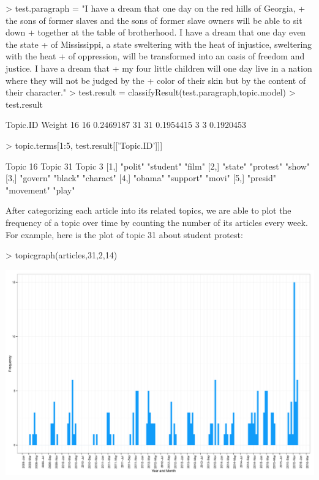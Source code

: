 \documentclass[a4paper]{article}
\begin{document}
\begin{Schunk}
\begin{Sinput}
> test.paragraph = "I have a dream that one day on the red hills of Georgia, 
+ the sons of former slaves and the sons of former slave owners will be able to sit down 
+ together at the table of brotherhood. I have a dream that one day even the state 
+ of Mississippi, a state sweltering with the heat of injustice, sweltering with the heat 
+ of oppression, will be transformed into an oasis of freedom and justice. I have a dream that 
+ my four little children will one day live in a nation where they will not be judged by the 
+ color of their skin but by the content of their character."
> test.result = classifyResult(test.paragraph,topic.model)
> test.result
\end{Sinput}
\begin{Soutput}
   Topic.ID    Weight
16       16 0.2469187
31       31 0.1954415
3         3 0.1920453
\end{Soutput}
\begin{Sinput}
> topic.terms[1:5, test.result[['Topic.ID']]]
\end{Sinput}
\begin{Soutput}
     Topic 16 Topic 31   Topic 3  
[1,] "polit"  "student"  "film"   
[2,] "state"  "protest"  "show"   
[3,] "govern" "black"    "charact"
[4,] "obama"  "support"  "movi"   
[5,] "presid" "movement" "play"   
\end{Soutput}
\end{Schunk}

After categorizing each article into its related topics, we are able to plot the frequency of a topic over time by counting the number of its articles every week. For example, here is the plot of topic 31 about student protest:

\begin{Schunk}
\begin{Sinput}
> topicgraph(articles,31,2,14)
\end{Sinput}
\end{Schunk}
\includegraphics{FinalProject-005}
\end{document}
